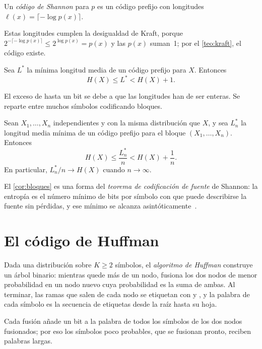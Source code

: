 \begin{definicion}\label{def:shannon}
Un \emph{código de Shannon} para $p$ es un código prefijo con longitudes $\ell(x)=\lceil-\log p(x)\rceil$.
\end{definicion}

Estas longitudes cumplen la desigualdad de Kraft, porque $2^{-\lceil-\log p(x)\rceil}\le2^{\log p(x)}=p(x)$ y las $p(x)$ suman~1; por el \cref{teo:kraft}, el código existe.

\begin{teorema}\label{teo:cotas}
Sea $L^{*}$ la mínima longitud media de un código prefijo para $X$. Entonces
\[
H(X)\le L^{*}<H(X)+1.
\]
\end{teorema}

El exceso de hasta un bit se debe a que las longitudes han de ser enteras. Se reparte entre muchos símbolos codificando bloques.

\begin{corolario}\label{cor:bloques}
Sean $X_1,\dots,X_n$ independientes y con la misma distribución que $X$, y sea $L_n^{*}$ la longitud media mínima de un código prefijo para el bloque $(X_1,\dots,X_n)$. Entonces
\[
H(X)\le\frac{L_n^{*}}{n}<H(X)+\frac1n.
\]
En particular, $L_n^{*}/n\to H(X)$ cuando $n\to\infty$.
\end{corolario}

El \cref{cor:bloques} es una forma del \emph{teorema de codificación de fuente} de Shannon: la entropía es el número mínimo de bits por símbolo con que puede describirse la fuente sin pérdidas, y ese mínimo se alcanza asintóticamente~\cite[cap.~4]{mackay}.

\section{El código de Huffman}

\begin{definicion}\label{def:huffman}
Dada una distribución sobre $K\ge 2$ símbolos, el \emph{algoritmo de Huffman} construye un árbol binario: mientras quede más de un nodo, fusiona los dos nodos de menor probabilidad en un nodo nuevo cuya probabilidad es la suma de ambas. Al terminar, las ramas que salen de cada nodo se etiquetan con  y , y la palabra de cada símbolo es la secuencia de etiquetas desde la raíz hasta su hoja.
\end{definicion}

Cada fusión añade un bit a la palabra de todos los símbolos de los dos nodos fusionados; por eso los símbolos poco probables, que se fusionan pronto, reciben palabras largas.

